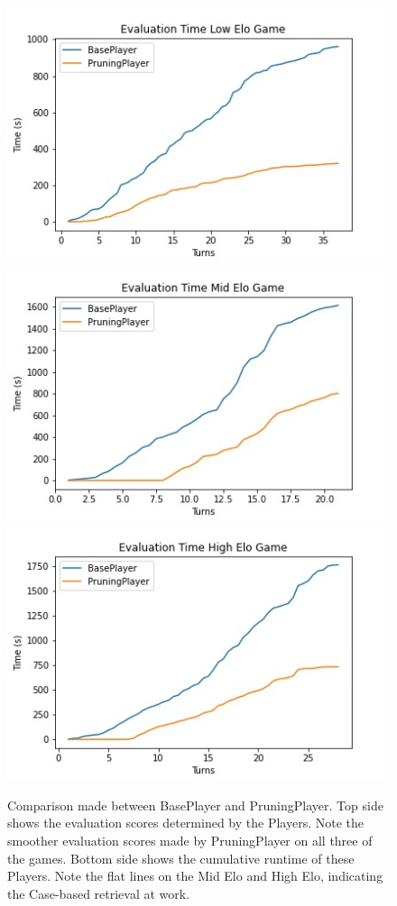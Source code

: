 \documentclass[letterpaper]{article}
\begin{document}
\begin{figure}
    \includegraphics[scale= 0.38]{low_game_time.jpg}
    \includegraphics[scale= 0.38]{mid_game_time.jpg}
    \includegraphics[scale= 0.38]{high_game_time.jpg}
  
    \caption{Comparison made between BasePlayer and PruningPlayer. Top side shows the evaluation scores determined by the Players. Note the smoother evaluation scores made by PruningPlayer on all three of the games. Bottom side shows the cumulative runtime of these Players. Note the flat lines on the Mid Elo and High Elo, indicating the Case-based retrieval at work.} 
    \label{score_timeEval}
\end{figure}
\end{document}
